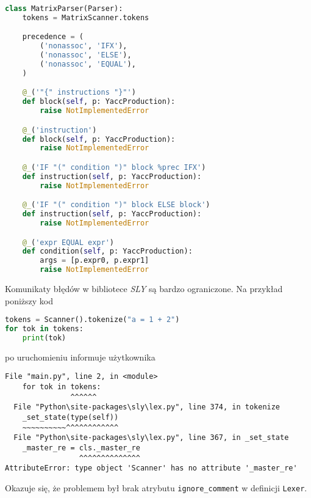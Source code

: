 \begin{lstlisting}[language=Python,float=!htbp,caption={Fragment definicji parsera w Pythonie, wykorzystujacy bibliotekę SLY},label={lst:lstlisting3}]
    class MatrixParser(Parser):
    tokens = MatrixScanner.tokens

    precedence = (
        ('nonassoc', 'IFX'),
        ('nonassoc', 'ELSE'),
        ('nonassoc', 'EQUAL'),
    )

    @_('"{" instructions "}"')
    def block(self, p: YaccProduction):
        raise NotImplementedError

    @_('instruction')
    def block(self, p: YaccProduction):
        raise NotImplementedError

    @_('IF "(" condition ")" block %prec IFX')
    def instruction(self, p: YaccProduction):
        raise NotImplementedError

    @_('IF "(" condition ")" block ELSE block')
    def instruction(self, p: YaccProduction):
        raise NotImplementedError

    @_('expr EQUAL expr')
    def condition(self, p: YaccProduction):
        args = [p.expr0, p.expr1]
        raise NotImplementedError

\end{lstlisting}

Komunikaty błędów w bibliotece \textit{SLY} są bardzo ograniczone.
Na przykład poniższy kod %
\begin{lstlisting}[language=Python,float=!htbp,caption={Fragment niedziałajacego kodu w Pythonie, wykorzystujacy bibliotekę SLY},label=lst:maximum]
tokens = Scanner().tokenize("a = 1 + 2")
for tok in tokens:
    print(tok)

\end{lstlisting}

po uruchomieniu informuje użytkownika
\begin{lstlisting}[language=terminal, caption={Przykład komunikatu błędu w bibliotece \textit{SLY}},label={lst:lstlisting}]
  File "main.py", line 2, in <module>
    for tok in tokens:
               ^^^^^^
  File "Python\site-packages\sly\lex.py", line 374, in tokenize
    _set_state(type(self))
    ~~~~~~~~~~^^^^^^^^^^^^
  File "Python\site-packages\sly\lex.py", line 367, in _set_state
    _master_re = cls._master_re
                 ^^^^^^^^^^^^^^
AttributeError: type object 'Scanner' has no attribute '_master_re'
\end{lstlisting}

Okazuje się, że problemem był brak atrybutu \verb|ignore_comment| w definicji \verb|Lexer|.


